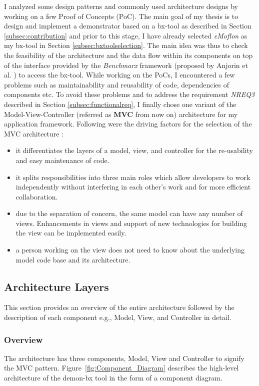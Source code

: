 I analyzed some design patterns and commonly used architecture designs by working on a few Proof of Concepts (PoC). The main goal of my thesis is to design and implement a demonstrator based on a bx-tool as described in Section \ref{subsec:contribution} and prior to this stage, I have already selected \textit{eMoflon} as my bx-tool in Section \ref{subsec:bxtoolselection}. The main idea was thus to check the feasibility of the architecture and the data flow within its components on top of the interface provided by the \textit{Benchmarx} framework (proposed by Anjorin et al. \cite{benchmarx-reload}) to access the bx-tool. While working on the PoCs, I encountered a few problems such as maintainability and reusability of code, dependencies of components etc. To avoid these problems and to address the requirement \textit{NREQ3} described in Section \ref{subsec:functionalreq}, I finally chose one variant of the Model-View-Controller (referred as \textbf{MVC} from now on) architecture for my application framework. Following were the driving factors for the selection of the MVC architecture \cite{designpattern-notes} \cite{designpattern-headfirst}:
\begin{itemize}
	\item {it differentiates the layers of a model, view, and controller for the re-usability and easy maintenance of code.}
	\item {it splits responsibilities into three main roles which allow developers to work independently without interfering in each other's work and for more efficient collaboration.}
	\item {due to the separation of concern, the same model can have any number of views. Enhancements in views and support of new technologies for building the view can be implemented easily.}
	\item {a person working on the view does not need to know about the underlying model code base and its architecture.}
\end{itemize}

\subsection{Architecture Layers}\label{subsec:design_layers}
This section provides an overview of the entire architecture followed by the description of each component e.g., Model, View, and Controller in detail.

\subsubsection{Overview}\label{subsubsec:design_overview}
The architecture has three components, Model, View and Controller to signify the MVC pattern. Figure~\ref{fig:Component_Diagram} describes the high-level architecture of the demon-bx tool in the form of a component diagram.
       
